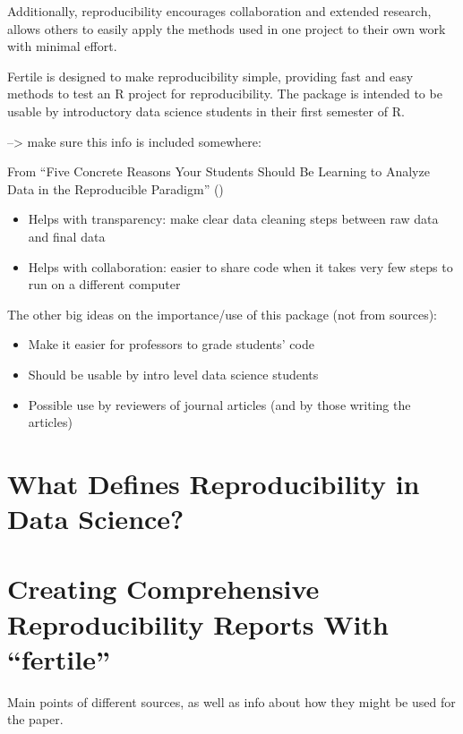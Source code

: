 \documentclass[12pt]{article}
\providecommand{\tightlist}{%
  \setlength{\itemsep}{0pt}\setlength{\parskip}{0pt}}
\begin{document}
Additionally, reproducibility encourages collaboration and extended
research, allows others to easily apply the methods used in one project
to their own work with minimal effort. \citet{bray2014five}

Fertile is designed to make reproducibility simple, providing fast and
easy methods to test an R project for reproducibility. The package is
intended to be usable by introductory data science students in their
first semester of R.

--\textgreater{} make sure this info is included somewhere:

From ``Five Concrete Reasons Your Students Should Be Learning to Analyze
Data in the Reproducible Paradigm'' (\citet{bray2014five})

\begin{itemize}
\tightlist
\item
  Helps with transparency: make clear data cleaning steps between raw
  data and final data
\item
  Helps with collaboration: easier to share code when it takes very few
  steps to run on a different computer
\end{itemize}

The other big ideas on the importance/use of this package (not from
sources):

\begin{itemize}
\tightlist
\item
  Make it easier for professors to grade students' code
\item
  Should be usable by intro level data science students
\item
  Possible use by reviewers of journal articles (and by those writing
  the articles)
\end{itemize}

\section{What Defines Reproducibility in Data
Science?}\label{what-defines-reproducibility-in-data-science}

\section{\texorpdfstring{Creating Comprehensive Reproducibility Reports
With
``fertile''}{Creating Comprehensive Reproducibility Reports With fertile}}\label{creating-comprehensive-reproducibility-reports-with-fertile}

Main points of different sources, as well as info about how they might
be used for the paper.
\end{document}
